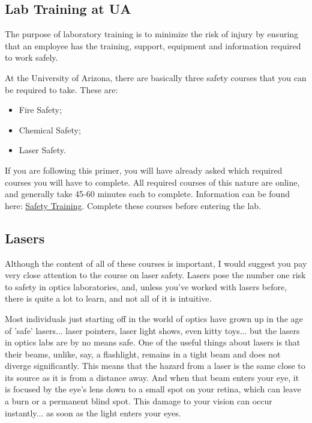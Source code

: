 \documentclass[11pt]{article}
\begin{document}
\subsection{Lab Training at UA}

The purpose of laboratory training is to minimize the risk of injury by ensuring that an employee has the training, support, equipment and information required to work safely.

At the University of Arizona, there are basically three safety courses that you can be required to take. These are:

\begin{itemize}[noitemsep]
  \item Fire Safety; 
  \item Chemical Safety; 
  \item Laser Safety.
\end{itemize}

If you are following this primer, you will have already asked which required courses you will have to complete. All required courses of this nature are online, and generally take 45-60 minutes each to complete. Information can be found here: \href{https://www.optics.arizona.edu/osc-students/lab-safety-training}{Safety Training}. Complete these courses before entering the lab.

\subsection{Lasers}

Although the content of all of these courses is important, I would suggest you pay very close attention to the course on laser safety. Lasers pose the number one risk to safety in optics laboratories, and, unless you've worked with lasers before, there is quite a lot to learn, and not all of it is intuitive. 

Most individuals just starting off in the world of optics have grown up in the age of 'safe' lasers... laser pointers, laser light shows, even kitty toys... but the lasers in optics labs are by no means safe. One of the useful things about lasers is that their beams, unlike, say, a flashlight, remains in a tight beam and does not diverge significantly. This means that the hazard from a laser is the same close to its source as it is from a distance away. And when that beam enters your eye, it is focused by the eye's lens down to a small spot on your retina, which can leave a burn or a permanent blind spot. This damage to your vision can occur instantly... as soon as the light enters your eyes. 
\end{document}
